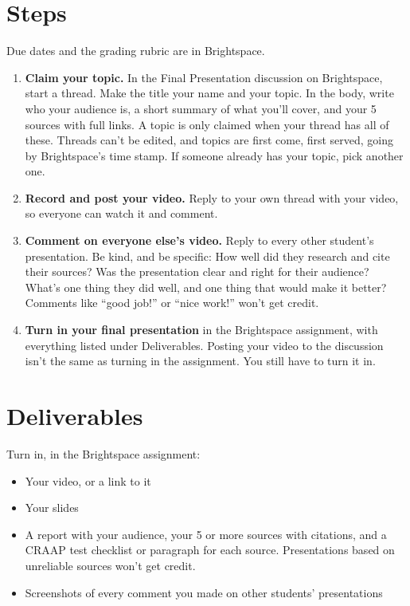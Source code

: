\documentclass[12pt]{article}
\begin{document}
\section*{Steps}
Due dates and the grading rubric are in Brightspace.
\begin{enumerate}
    \item \textbf{Claim your topic.} In the Final Presentation discussion on Brightspace, start a thread. Make the title your name and your topic. In the body, write who your audience is, a short summary of what you'll cover, and your 5 sources with full links. A topic is only claimed when your thread has all of these. Threads can't be edited, and topics are first come, first served, going by Brightspace's time stamp. If someone already has your topic, pick another one.
    \item \textbf{Record and post your video.} Reply to your own thread with your video, so everyone can watch it and comment.
    \item \textbf{Comment on everyone else's video.} Reply to every other student's presentation. Be kind, and be specific: How well did they research and cite their sources? Was the presentation clear and right for their audience? What's one thing they did well, and one thing that would make it better? Comments like ``good job!'' or ``nice work!'' won't get credit.
    \item \textbf{Turn in your final presentation} in the Brightspace assignment, with everything listed under Deliverables. Posting your video to the discussion isn't the same as turning in the assignment. You still have to turn it in.
\end{enumerate}

\section*{Deliverables}
Turn in, in the Brightspace assignment:
\begin{itemize}
    \item Your video, or a link to it
    \item Your slides
    \item A report with your audience, your 5 or more sources with citations, and a CRAAP test checklist or paragraph for each source. Presentations based on unreliable sources won't get credit.
    \item Screenshots of every comment you made on other students' presentations
\end{itemize}
\end{document}
